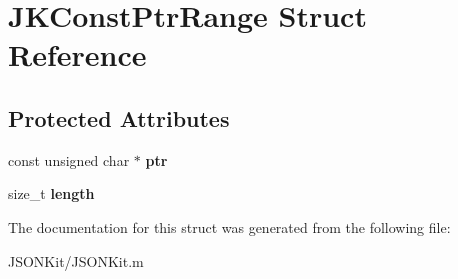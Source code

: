 \hypertarget{struct_j_k_const_ptr_range}{\section{J\+K\+Const\+Ptr\+Range Struct Reference}
\label{struct_j_k_const_ptr_range}
}
\subsection*{Protected Attributes}
\begin{DoxyCompactItemize}
\item 
\hypertarget{struct_j_k_const_ptr_range_afa2519e22b4232f1e2e01f23b5c3df4f}{const unsigned char $\ast$ {\bfseries ptr}}\label{struct_j_k_const_ptr_range_afa2519e22b4232f1e2e01f23b5c3df4f}

\item 
\hypertarget{struct_j_k_const_ptr_range_a71e6d672adc0a4ab55448c2bb585d582}{size\+\_\+t {\bfseries length}}\label{struct_j_k_const_ptr_range_a71e6d672adc0a4ab55448c2bb585d582}

\end{DoxyCompactItemize}


The documentation for this struct was generated from the following file\+:\begin{DoxyCompactItemize}
\item 
J\+S\+O\+N\+Kit/J\+S\+O\+N\+Kit.\+m\end{DoxyCompactItemize}
